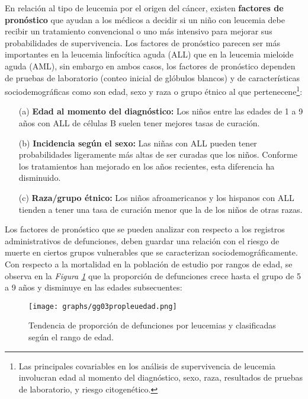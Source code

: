 \documentclass[11pt, oneside]{book}
\begin{document}
En relación al tipo de leucemia por el origen del cáncer, existen \textbf{factores de pronóstico} que ayudan a los médicos a decidir si un niño con leucemia debe recibir un tratamiento convencional o uno más intensivo para mejorar sus probabilidades de supervivencia.  Los factores de pronóstico parecen ser más importantes en la leucemia linfocítica aguda (ALL) que en la leucemia mieloide aguda (AML), sin embargo en ambos casos, los factores de pronóstico dependen de pruebas de laboratorio (conteo inicial de glóbulos blancos) y de características sociodemográficas como son edad, sexo y raza o grupo étnico al que pertenecene\footnote{Las principales covariables en los análisis de supervivencia de leucemia involucran edad al momento del diagnóstico, sexo, raza, resultados de  pruebas de laboratorio, y riesgo citogenético\cite{cancer}.}:

\begin{itemize}
  \item[(a)] \textbf{Edad al momento del diagnóstico:} Los niños entre las edades de 1 a 9 años con ALL de células B suelen tener mejores tasas de curación.
  \item[(b)] \textbf{Incidencia según el sexo:} Las niñas con ALL pueden tener probabilidades ligeramente más altas de ser curadas que los niños. Conforme los tratamientos han mejorado en los años recientes, esta diferencia ha disminuido.
  \item[(c)] \textbf{Raza/grupo étnico:} Los niños afroamericanos y los hispanos con ALL tienden a tener una tasa de curación menor que la de los niños de otras razas.
\end{itemize}

Los factores de pronóstico que se pueden analizar con respecto a los registros administrativos de defunciones, deben guardar una relación con el riesgo de muerte en ciertos grupos vulnerables que se caracterizan sociodemográficamente. Con respecto a la mortalidad en la población de estudio por rangos de edad, se observa en la \emph{Figura \ref{fig4.edad}} que la proporción de defunciones crece hasta el grupo de 5 a 9 años y disminuye en las edades subsecuentes:

\begin{figure}[ht]
    \centering
    \texttt{[image: graphs/gg03propleuedad.png]}
  \caption{Tendencia de proporción de defunciones por leucemias y clasificadas según el rango de edad.}
  \label{fig4.edad}
\end{figure}
\end{document}
